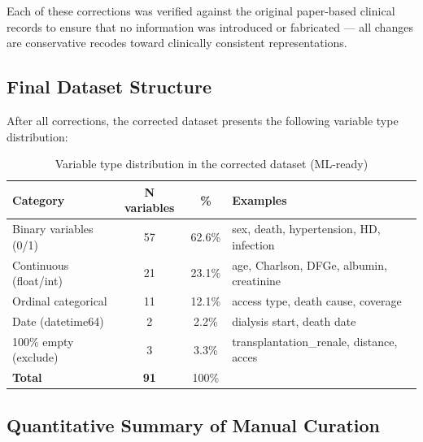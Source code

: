 \documentclass[12pt,a4paper,twoside]{report}
\begin{document}
Each of these corrections was verified against the original paper-based clinical records to ensure that no information was introduced or fabricated — all changes are conservative recodes toward clinically consistent representations.

\subsection{Final Dataset Structure}

After all corrections, the corrected dataset presents the following variable type distribution:

\begin{table}[htbp]
\centering
\caption{Variable type distribution in the corrected dataset (ML-ready)}
\label{tab:v2_structure}
\begin{tabularx}{\textwidth}{lccX}
\toprule
\textbf{Category} & \textbf{N variables} & \textbf{\%} & \textbf{Examples} \\
\midrule
Binary variables (0/1) & 57 & 62.6\% & sex, death, hypertension, HD, infection \\
Continuous (float/int) & 21 & 23.1\% & age, Charlson, DFGe, albumin, creatinine \\
Ordinal categorical & 11 & 12.1\% & access type, death cause, coverage \\
Date (datetime64) & 2 & 2.2\% & dialysis start, death date \\
100\% empty (exclude) & 3 & 3.3\% & transplantation\_renale, distance, acces \\
\midrule
\textbf{Total} & \textbf{91} & 100\% & \\
\bottomrule
\end{tabularx}
\end{table}

\subsection{Quantitative Summary of Manual Curation}
\end{document}
